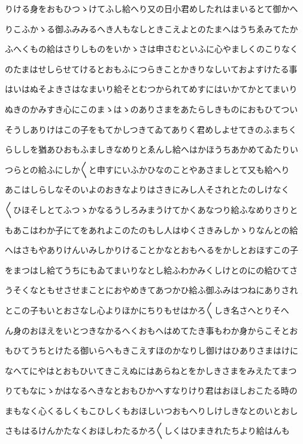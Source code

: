 \documentclass[a4paper,11pt,landscape]{ltjtarticle}
\begin{document}
りける身をおもひつゝけてふし給へり又の日小君めしたれはまいるとて御かへ
\par\medskip
りこふかゝる御ふみみるへき人もなしときこえよとのたまへはうちゑみてたか
\par\medskip
ふへくもの給はさりしものをいかゝさは申さむといふに心やましくのこりなく
\par\medskip
のたまはせしらせてけるとおもふにつらきことかきりなしいておよすけたる事
\par\medskip
はいはぬそよきさはなまいり給そとむつかられてめすにはいかてかとてまいり
\par\medskip
ぬきのかみすき心にこのまゝはゝのありさまをあたらしきものにおもひてつい
\par\medskip
そうしありけはこの子をもてかしつきてゐてありく君めしよせてきのふまちく
\par\medskip
らししを猶あひおもふましきなめりとゑんし給へはかほうちあかめてゐたりい
\par\medskip
つらとの給ふにしか〱と申すにいふかひなのことやあさましとて又も給へり
\par\medskip
あこはしらしなそのいよのおきなよりはさきにみし人そされとたのしけなく
\par\medskip
〱ひほそしとてふつゝかなるうしろみまうけてかくあなつり給ふなめりさりと
\par\medskip
もあこはわか子にてをあれよこのたのもし人はゆくさきみしかゝりなんとの給
\par\medskip
へはさもやありけんいみしかりけることかなとおもへるをかしとおほすこの子
\par\medskip
をまつはし給てうちにもゐてまいりなとし給ふわかみくしけとのにの給ひてさ
\par\medskip
うそくなともせさせまことにおやめきてあつかひ給ふ御ふみはつねにありされ
\par\medskip
とこの子もいとおさなし心よりほかにちりもせはかろ〱しき名さへとりそへ
\par\medskip
ん身のおほえをいとつきなかるへくおもへはめてたき事もわか身からこそとお
\par\medskip
もひてうちとけたる御いらへもきこえすほのかなりし御けはひありさまはけに
\par\medskip
なへてにやはとおもひいてきこえぬにはあらねとをかしきさまをみえたてまつ
\par\medskip
りてもなにゝかはなるへきなとおもひかへすなりけり君はおほしおこたる時の
\par\medskip
まもなく心くるしくもこひしくもおほしいつおもへりしけしきなとのいとおし
\par\medskip
さもはるけんかたなくおほしわたるかろ〱しくはひまきれたちより給はんも
\end{document}
